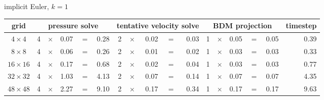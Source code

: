 \begin{center}
    implicit Euler, $k=1$\\[1ex]
    \begin{tabular}{|c|rcrcr|rcrcr|rcrcr|r|}
        \hline
        grid                                           &
        \multicolumn{5}{|c|}{pressure solve}           &
        \multicolumn{5}{|c|}{tentative velocity solve} &
        \multicolumn{5}{|c|}{BDM projection}           &
        timestep                                                                                                                                                       \\
        \hline\hline
        $ 4\times 4$                                   & 4 & $\times$ & 0.07 & $=$ & 0.28 & 2 & $\times$ & 0.02 & $=$ & 0.03 & 1 & $\times$ & 0.05 & $=$ & 0.05 & 0.39 \\
        $ 8\times 8$                                   & 4 & $\times$ & 0.06 & $=$ & 0.26 & 2 & $\times$ & 0.01 & $=$ & 0.02 & 1 & $\times$ & 0.03 & $=$ & 0.03 & 0.33 \\
        $16\times16$                                   & 4 & $\times$ & 0.17 & $=$ & 0.68 & 2 & $\times$ & 0.02 & $=$ & 0.04 & 1 & $\times$ & 0.03 & $=$ & 0.03 & 0.77 \\
        $32\times32$                                   & 4 & $\times$ & 1.03 & $=$ & 4.13 & 2 & $\times$ & 0.07 & $=$ & 0.14 & 1 & $\times$ & 0.07 & $=$ & 0.07 & 4.35 \\
        $48\times48$                                   & 4 & $\times$ & 2.27 & $=$ & 9.10 & 2 & $\times$ & 0.17 & $=$ & 0.34 & 1 & $\times$ & 0.17 & $=$ & 0.17 & 9.63 \\
        \hline\end{tabular}
\end{center}


